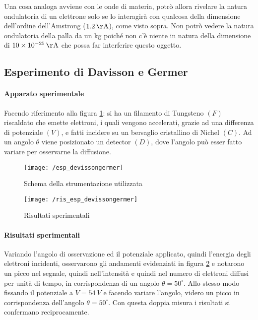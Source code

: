 Una cosa analoga avviene con le onde di materia, potrò allora rivelare la natura ondulatoria di un elettrone solo se lo interagirà con qualcosa della dimensione dell'ordine dell'Amstrong ($\SI{1.2}{\AA}$), come visto sopra.
Non potrò vedere la natura ondulatoria della palla da un kg poiché non c'è niente in natura della dimensione di $\SI{10e-25}{\AA}$ che possa far interferire questo oggetto.







\subsection{Esperimento di Davisson e Germer}
\paragraph{Apparato sperimentale} 
Facendo riferimento alla figura \ref{app_spe}: si ha un filamento di Tungsteno $(F)$ riscaldato che emette elettroni, i quali vengono accelerati, grazie ad una differenza di potenziale $(V)$, e fatti incidere su un bersaglio cristallino di Nichel $(C)$.
Ad un angolo $\theta$ viene posizionato un detector $(D)$, dove l'angolo può esser fatto variare per osservarne la diffusione.

\begin{figure}[h]
\centering
\texttt{[image: /esp\_devissongermer]}
\caption{Schema della strumentazione utilizzata}
\label{app_spe}
\end{figure}
\begin{figure}[h]
\centering
\texttt{[image: /ris\_esp\_devissongermer]}
\caption{Risultati sperimentali}
\label{res_spe}
\end{figure}

\paragraph{Risultati sperimentali}
Variando l'angolo di osservazione ed il potenziale applicato, quindi l'energia degli elettroni incidenti, osservarono gli andamenti evidenziati in figura \ref{res_spe} e notarono un picco nel segnale, quindi nell'intensità e quindi nel numero di elettroni diffusi per unità di tempo, in corrispondenza di un angolo $\theta = 50^{\circ}$.
Allo stesso modo fissando il potenziale a $V = \SI{54}{V}$ e facendo variare l'angolo, videro un picco in corrispondenza dell'angolo $\theta = 50^{\circ}$.
Con questa doppia misura i risultati si confermano reciprocamente.

